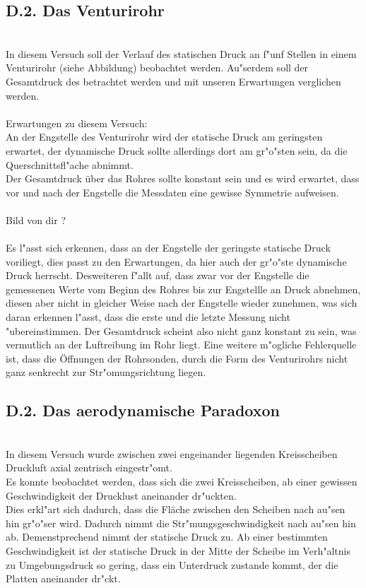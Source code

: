 \documentclass[12pt, a4paper]{article}
\begin{document}
\subsection{D.2. Das Venturirohr}
\\
In diesem Versuch soll der Verlauf des statischen Druck an f"unf Stellen in einem Venturirohr (siehe Abbildung) beobachtet werden. Au"serdem soll der Gesamtdruck des betrachtet werden und mit unseren Erwartungen verglichen werden. \\
\\
Erwartungen zu diesem Versuch: \\
An der Engstelle des Venturirohr wird der statische Druck am geringsten erwartet, der dynamische Druck sollte allerdings dort am gr"o"sten sein, da die Querschnittsfl"ache abnimmt. \\
Der Gesamtdruck über das Rohres sollte konstant sein und es wird erwartet, dass vor und nach der Engstelle die Messdaten eine gewisse Symmetrie aufweisen.  \\
\\
Bild von dir ? \\
\\
Es l"asst sich erkennen, dass an der Engstelle der geringste statische Druck voriliegt, dies passt zu den Erwartungen, da hier auch der gr"o"ste dynamische Druck herrscht. Desweiteren f"allt auf, dass zwar vor der Engstelle die gemessenen Werte vom Beginn des Rohres bis zur Engstellle an Druck abnehmen, diesen aber nicht in gleicher Weise nach der Engstelle wieder zunehmen, was sich daran erkennen l"asst, dass die erste und die letzte Messung nicht "ubereinstimmen. Der Gesamtdruck scheint also nicht ganz konstant zu sein, was vermutlich an der Luftreibung im Rohr liegt. Eine weitere m"ogliche Fehlerquelle ist, dass die Öffnungen der Rohrsonden, durch die Form des Venturirohrs nicht ganz senkrecht zur Str"omungsrichtung liegen.
\\
\subsection{D.2. Das aerodynamische Paradoxon}
\\
In diesem Versuch wurde zwischen zwei engeinander liegenden Kreisscheiben
Druckluft axial zentrisch eingestr"omt. \\
Es konnte beobachtet werden, dass sich die zwei Kreisscheiben, ab einer gewissen Geschwindigkeit der Drucklust aneinander dr"uckten. \\
Dies erkl"art sich dadurch, dass die Fläche zwischen den Scheiben nach au"sen hin gr"o"ser wird. Dadurch nimmt die Str"mungsgeschwindigkeit nach  au"sen hin ab. Demenstprechend nimmt der statische Druck zu. Ab einer bestimmten Geschwindigkeit ist der statische Druck in der Mitte der Scheibe im Verh"altnis zu Umgebungsdruck so gering, dass ein Unterdruck zustande kommt, der die Platten aneinander dr"ckt.
\end{document}
